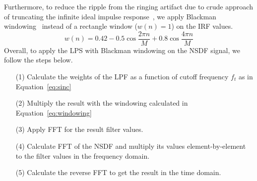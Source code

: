 Furthermore, to reduce the ripple from the ringing artifact due to crude approach of truncating the infinite ideal impulse response~\cite{Smith1997DSP,Bankman2008image}, we apply Blackman windowing~\cite{Harris1978use,Blackman1958measurement} instead of a rectangle window ($w(n)=1$) on the IRF values.
\begin{equation}
\label{eq:windowing}
w(n)=0.42-0.5\cos{\frac{\displaystyle 2\pi n}{\displaystyle M}}+0.8\cos{\frac{\displaystyle 4\pi n}{\displaystyle M}}
\end{equation}
Overall, to apply the LPS with Blackman windowing on the NSDF signal, we follow the steps below.
\begin{itemize}
    \item[(1)] Calculate the weights of the LPF as a function of cutoff frequency $f_t$ as in Equation~\ref{eq:sinc}
    \item[(2)] Multiply the result with the windowing calculated in Equation~\ref{eq:windowing}
    \item[(3)] Apply FFT for the result filter values.
    \item[(4)] Calculate FFT of the NSDF and multiply its values element-by-element to the filter values in the frequency domain.
    \item[(5)] Calculate the reverse FFT to get the result in the time domain.
\end{itemize}


